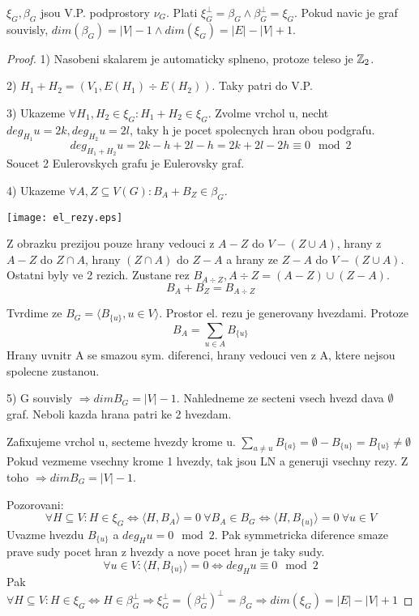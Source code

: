\begin{theorem}
	$\xi_G, \beta_G$ jsou V.P. podprostory $\nu_G$. Plati $\xi_G^{\perp} = \beta_G \land \beta_G^{\perp} = \xi_G$. Pokud navic je graf souvisly, $dim(\beta_G) = |V| - 1 \land dim(\xi_G) = |E| - |V| + 1$.
\end{theorem}
\begin{proof}
	1) Nasobeni skalarem je automaticky splneno, protoze teleso je $\operatorname{\mathbb{Z}}_2$.

	2) $H_1 + H_2 = (V_1, E(H_1) \div E(H_2))$. Taky patri do V.P.

	3) Ukazeme $\forall H_1, H_2 \in \xi_G: H_1 + H_2 \in \xi_G$. Zvolme vrchol u, necht $deg_{H_1} u = 2k, deg_{H_2} u = 2l$, taky h je pocet spolecnych hran obou podgrafu.
	\[ deg_{H_1 + H_2} u = 2k - h + 2l - h = 2k + 2l - 2h \equiv 0 \mod2 \]
	Soucet 2 Eulerovskych grafu je Eulerovsky graf.

	4) Ukazeme $\forall A,Z \subseteq V(G): B_A + B_Z \in \beta_G$.

	\texttt{[image: el\_rezy.eps]}

	Z obrazku prezijou pouze hrany vedouci z $A - Z$ do $V - (Z\cup A)$, hrany z $A - Z$ do $Z \cap A$, hrany $(Z \cap A)$ do $Z - A$ a hrany ze $Z - A$ do $V - (Z\cup A)$. Ostatni byly ve 2 rezich. Zustane rez $B_{A \div Z}, A \div Z = (A - Z) \cup (Z - A)$.
	\[ B_A + B_Z = B_{A \div Z}\]

	Tvrdime ze $B_G = \langle B_{\{u\}}, u \in V \rangle$. Prostor el. rezu je generovany hvezdami. Protoze
	\[ B_A = \sum_{u \in A} B_{\{u\}} \]
	Hrany uvnitr A se smazou sym. diferenci, hrany vedouci ven z A, ktere nejsou spolecne zustanou.

	5) G souvisly $\Rightarrow dim B_G = |V| - 1$. Nahledneme ze secteni vsech hvezd dava $\emptyset$ graf. Neboli kazda hrana patri ke 2 hvezdam.

	Zafixujeme vrchol u, secteme hvezdy krome u. $ \sum_{a \ne u} B_{\{a\}} = \emptyset - B_{\{u\}} = B_{\{u\}} \ne \emptyset $
	Pokud vezmeme vsechny krome 1 hvezdy, tak jsou LN a generuji vsechny rezy. Z toho $\Rightarrow dim B_G = |V| - 1$.

	Pozorovani:
	\[ \forall H \subseteq V: H \in \xi_G \iff \langle H, B_A \rangle = 0 \ \forall B_A \in B_G \iff \langle H, B_{\{u\}} \rangle = 0 \ \forall u \in V \]
	Uvazme hvezdu $B_{\{u\}}$ a $deg_H u = 0 \mod2$. Pak symmetricka diference smaze prave sudy pocet hran z hvezdy a nove pocet hran je taky sudy.
	\[ \forall u \in V: \langle H, B_{\{u\}} \rangle = 0 \iff deg_H u \equiv 0 \mod2 \]
		Pak $ \forall H \subseteq V: H \in \xi_G \iff H \in \beta_G^{\perp} \Rightarrow \xi_G^{\perp} = (\beta_G^{\perp})^{\perp} = \beta_G \Rightarrow dim(\xi_G) = |E| - |V| + 1 $

\end{proof}
